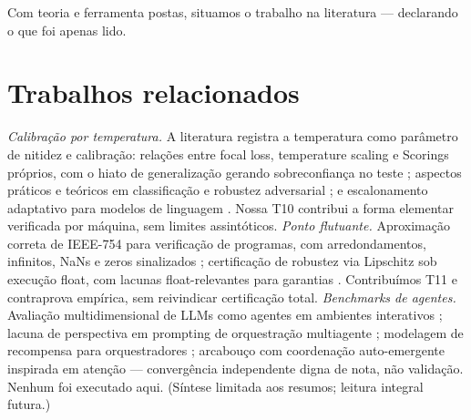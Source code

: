 Com teoria e ferramenta postas, situamos o trabalho na literatura --- declarando o que foi apenas lido.
\section{Trabalhos relacionados}
\textit{Calibração por temperatura.} A literatura registra a temperatura como parâmetro de nitidez e calibração: relações entre focal loss, temperature scaling e Scorings próprios, com o hiato de generalização gerando sobreconfiança no teste \cite{komisarenko2024}; aspectos práticos e teóricos em classificação e robustez adversarial \cite{xuan2025}; e escalonamento adaptativo para modelos de linguagem \cite{xie2024}. Nossa T10 contribui a forma elementar verificada por máquina, sem limites assintóticos. \textit{Ponto flutuante.} Aproximação correta de IEEE-754 para verificação de programas, com arredondamentos, infinitos, NaNs e zeros sinalizados \cite{bagnara2019}; certificação de robustez via Lipschitz sob execução float, com lacunas float-relevantes para garantias \cite{murray2026}. Contribuímos T11 e contraprova empírica, sem reivindicar certificação total. \textit{Benchmarks de agentes.} Avaliação multidimensional de LLMs como agentes em ambientes interativos \cite{agentbench2023}; lacuna de perspectiva em prompting de orquestração multiagente \cite{perspectivegap2026}; modelagem de recompensa para orquestradores \cite{orchrm2026}; arcabouço com coordenação auto-emergente inspirada em atenção \cite{orchestrator2025} --- convergência independente digna de nota, não validação. Nenhum foi executado aqui. (Síntese limitada aos resumos; leitura integral futura.)
